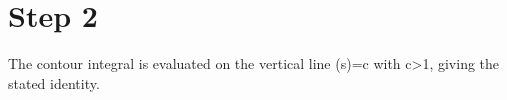\section*{Step 2}

The contour integral is evaluated on the vertical line \Re(s)=c with c>1, giving the stated identity.
